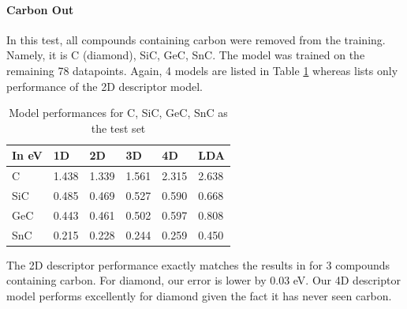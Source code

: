 \documentclass[11pt,oneside,czech,american]{book} %
\theoremstyle{definition} %
\theoremstyle{definition}
\begin{document}
\paragraph{Carbon Out}
In this test, all compounds containing carbon were removed from the training. Namely, it is C (diamond), SiC, GeC, SnC. The model was trained on the remaining 78 datapoints. Again, 4 models are listed in Table \ref{carbon} whereas \parencite{ghiringhelli17} lists only performance of the 2D descriptor model.
\begin{table}[H]
	\centering
	\begin{tabular}{llllll} 
		\hline
		In eV & 1D    & 2D    & 3D    & 4D    & LDA    \\ 
		\hline
		C     & 1.438 & 1.339 & 1.561 & 2.315 & 2.638  \\ 		
		SiC   & 0.485 & 0.469 & 0.527 & 0.590 & 0.668  \\ 
		GeC   & 0.443 & 0.461 & 0.502 & 0.597 & 0.808  \\ 
		SnC   & 0.215 & 0.228 & 0.244 & 0.259 & 0.450  \\
		\hline
	\end{tabular}
	\caption{Model performances for C, SiC, GeC, SnC as the test set}
	\label{carbon}
\end{table}
The 2D descriptor performance exactly matches the results in \parencite{ghiringhelli17} for 3 compounds containing carbon. For diamond, our error is lower by 0.03 eV. Our 4D descriptor model performs excellently for diamond given the fact it has never seen carbon.

\end{document}
